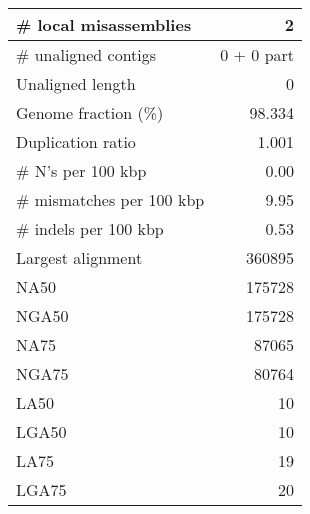 \documentclass[12pt,a4paper]{article}
\begin{document}
\begin{table}[ht]
\begin{center}
\begin{tabular}{|l*{1}{|r}|}
\# local misassemblies & 2 \\ \hline
\# unaligned contigs & 0 + 0 part \\ \hline
Unaligned length & 0 \\ \hline
Genome fraction (\%) & 98.334 \\ \hline
Duplication ratio & 1.001 \\ \hline
\# N's per 100 kbp & 0.00 \\ \hline
\# mismatches per 100 kbp & 9.95 \\ \hline
\# indels per 100 kbp & 0.53 \\ \hline
Largest alignment & 360895 \\ \hline
NA50 & 175728 \\ \hline
NGA50 & 175728 \\ \hline
NA75 & 87065 \\ \hline
NGA75 & 80764 \\ \hline
LA50 & 10 \\ \hline
LGA50 & 10 \\ \hline
LA75 & 19 \\ \hline
LGA75 & 20 \\ \hline
\end{tabular}
\end{center}
\end{table}
\end{document}
